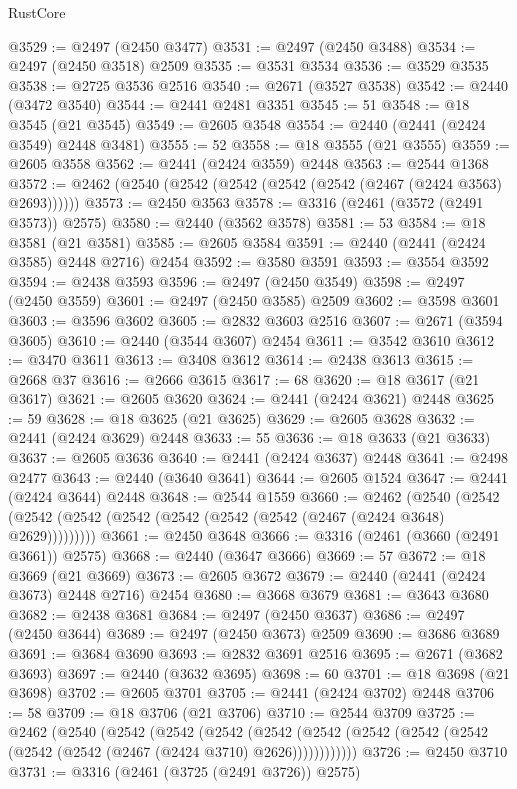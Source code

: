 \begin{lexlean}{RustCore}
\begin{coremodule}
@3529 := @2497 (@2450 @3477)
@3531 := @2497 (@2450 @3488)
@3534 := @2497 (@2450 @3518) @2509
@3535 := @3531 @3534
@3536 := @3529 @3535
@3538 := @2725 @3536 @2516
@3540 := @2671 (@3527 @3538)
@3542 := @2440 (@3472 @3540)
@3544 := @2441 @2481 @3351
@3545 := 51
@3548 := @18 @3545 (@21 @3545)
@3549 := @2605 @3548
@3554 := @2440 (@2441 (@2424 @3549) @2448 @3481)
@3555 := 52
@3558 := @18 @3555 (@21 @3555)
@3559 := @2605 @3558
@3562 := @2441 (@2424 @3559) @2448
@3563 := @2544 @1368
@3572 := @2462 (@2540 (@2542 (@2542 (@2542 (@2542 (@2467 (@2424 @3563) @2693))))))
@3573 := @2450 @3563
@3578 := @3316 (@2461 (@3572 (@2491 @3573)) @2575)
@3580 := @2440 (@3562 @3578)
@3581 := 53
@3584 := @18 @3581 (@21 @3581)
@3585 := @2605 @3584
@3591 := @2440 (@2441 (@2424 @3585) @2448 @2716) @2454
@3592 := @3580 @3591
@3593 := @3554 @3592
@3594 := @2438 @3593
@3596 := @2497 (@2450 @3549)
@3598 := @2497 (@2450 @3559)
@3601 := @2497 (@2450 @3585) @2509
@3602 := @3598 @3601
@3603 := @3596 @3602
@3605 := @2832 @3603 @2516
@3607 := @2671 (@3594 @3605)
@3610 := @2440 (@3544 @3607) @2454
@3611 := @3542 @3610
@3612 := @3470 @3611
@3613 := @3408 @3612
@3614 := @2438 @3613
@3615 := @2668 @37
@3616 := @2666 @3615
@3617 := 68
@3620 := @18 @3617 (@21 @3617)
@3621 := @2605 @3620
@3624 := @2441 (@2424 @3621) @2448
@3625 := 59
@3628 := @18 @3625 (@21 @3625)
@3629 := @2605 @3628
@3632 := @2441 (@2424 @3629) @2448
@3633 := 55
@3636 := @18 @3633 (@21 @3633)
@3637 := @2605 @3636
@3640 := @2441 (@2424 @3637) @2448
@3641 := @2498 @2477
@3643 := @2440 (@3640 @3641)
@3644 := @2605 @1524
@3647 := @2441 (@2424 @3644) @2448
@3648 := @2544 @1559
@3660 := @2462
    (@2540 (@2542 (@2542 (@2542 (@2542 (@2542 (@2542 (@2542 (@2467 (@2424 @3648) @2629)))))))))
@3661 := @2450 @3648
@3666 := @3316 (@2461 (@3660 (@2491 @3661)) @2575)
@3668 := @2440 (@3647 @3666)
@3669 := 57
@3672 := @18 @3669 (@21 @3669)
@3673 := @2605 @3672
@3679 := @2440 (@2441 (@2424 @3673) @2448 @2716) @2454
@3680 := @3668 @3679
@3681 := @3643 @3680
@3682 := @2438 @3681
@3684 := @2497 (@2450 @3637)
@3686 := @2497 (@2450 @3644)
@3689 := @2497 (@2450 @3673) @2509
@3690 := @3686 @3689
@3691 := @3684 @3690
@3693 := @2832 @3691 @2516
@3695 := @2671 (@3682 @3693)
@3697 := @2440 (@3632 @3695)
@3698 := 60
@3701 := @18 @3698 (@21 @3698)
@3702 := @2605 @3701
@3705 := @2441 (@2424 @3702) @2448
@3706 := 58
@3709 := @18 @3706 (@21 @3706)
@3710 := @2544 @3709
@3725 := @2462
    (@2540
      (@2542
        (@2542
          (@2542
            (@2542 (@2542 (@2542 (@2542 (@2542 (@2542 (@2542 (@2467 (@2424 @3710) @2626))))))))))))
@3726 := @2450 @3710
@3731 := @3316 (@2461 (@3725 (@2491 @3726)) @2575)

\end{coremodule}
\end{lexlean}
